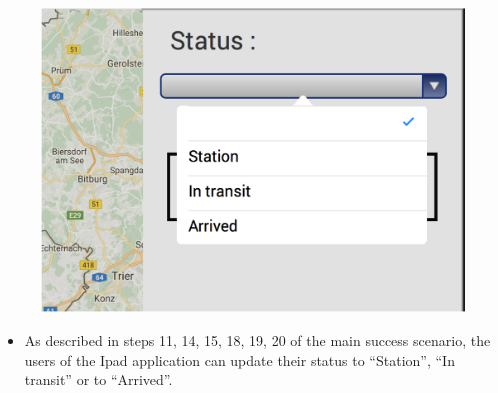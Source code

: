 \begin{minipage}{0.72\textwidth}
\begin{figure}[H]
\includegraphics[width=1.0\textwidth]{Ipad_status.eps}
\end{figure}
\end{minipage} \hfill
\begin{minipage}{0.23\textwidth}
\begin{itemize}
\item As described in steps 11, 14, 15, 18, 19, 20 of the main success scenario,
the users of the Ipad application can update their status to ``Station'', ``In
transit'' or to ``Arrived''.
\end{itemize}
\end{minipage}



